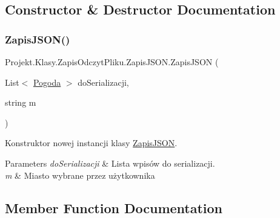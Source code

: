 \subsection{Constructor \& Destructor Documentation}
\mbox{\label{class_projekt_1_1_klasy_1_1_zapis_odczyt_pliku_1_1_zapis_j_s_o_n_ac4c8bcd41a88b8755f686a76a90cf39c}} 
\subsubsection{\texorpdfstring{ZapisJSON()}{ZapisJSON()}}
{\footnotesize\ttfamily Projekt.\+Klasy.\+Zapis\+Odczyt\+Pliku.\+Zapis\+J\+S\+O\+N.\+Zapis\+J\+S\+ON (\begin{DoxyParamCaption}\item[{List$<$ \mbox{\hyperlink{class_projekt_1_1_baza_1_1_pogoda}{Pogoda}} $>$}]{do\+Serializacji,  }\item[{string}]{m }\end{DoxyParamCaption})}



Konstruktor nowej instancji klasy \mbox{\hyperlink{class_projekt_1_1_klasy_1_1_zapis_odczyt_pliku_1_1_zapis_j_s_o_n}{Zapis\+J\+S\+ON}}. 


\begin{DoxyParams}{Parameters}
{\em do\+Serializacji} & Lista wpisów do serializacji.\\
\hline
{\em m} & Miasto wybrane przez użytkownika\\
\hline
\end{DoxyParams}


\subsection{Member Function Documentation}
\mbox{\label{class_projekt_1_1_klasy_1_1_zapis_odczyt_pliku_1_1_zapis_j_s_o_n_a8a947e364a71755f2a00b0d7c8236cee}} 
